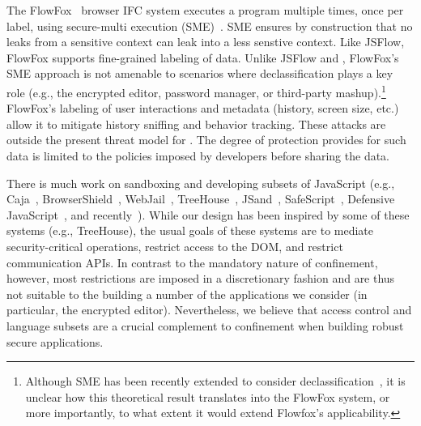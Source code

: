 The FlowFox~\cite{DeGroef:2012} browser IFC system executes a
program multiple times, once per label, using secure-multi execution
(SME)~\cite{Devriese:2010}. SME ensures by construction that no leaks
from a sensitive context can leak into a less senstive context.
%
Like JSFlow, FlowFox supports fine-grained labeling of data.
%
Unlike JSFlow and \sys{}, FlowFox's SME approach is not amenable to
scenarios where declassification plays a key role (e.g., the encrypted
editor, password manager, or third-party mashup).\footnote{Although
  SME has been recently extended to consider
  declassification~\cite{Rafnsson:2013}, it is unclear how this
  theoretical result translates into the FlowFox system, or more
  importantly, to what extent it would extend Flowfox's applicability.}
%
FlowFox's labeling of user interactions and metadata (history, screen
size, etc.) allow it to mitigate history sniffing and behavior
tracking.
%
These attacks are outside the present threat model for \sys{}.  The
degree of protection \sys{} provides for such data is limited to the
policies imposed by developers before sharing the data.

%



There is much work on sandboxing and developing subsets of JavaScript (e.g.,
Caja~\cite{GoogleCaja}, BrowserShield~\cite{Reis:2007},
WebJail~\cite{VanAcker:2011}, TreeHouse~\cite{Ingram:2012},
JSand~\cite{Agten:2012:JCC}, SafeScript~\cite{SafeScript}, Defensive
JavaScript~\cite{djs}, and recently~\cite{Howell:2013}). 
%
While our design has been inspired by some of these systems (e.g.,
TreeHouse), the usual goals of these systems are to mediate
security-critical operations, restrict access to the DOM, and restrict
communication APIs\@.
%
In contrast to the mandatory nature of confinement, however, most restrictions
are imposed in a discretionary fashion and are thus not suitable to the
building a number of the applications we consider (in particular, the encrypted
editor).
%
Nevertheless, we believe that access control and language subsets are a crucial
complement to confinement when building robust secure applications.



